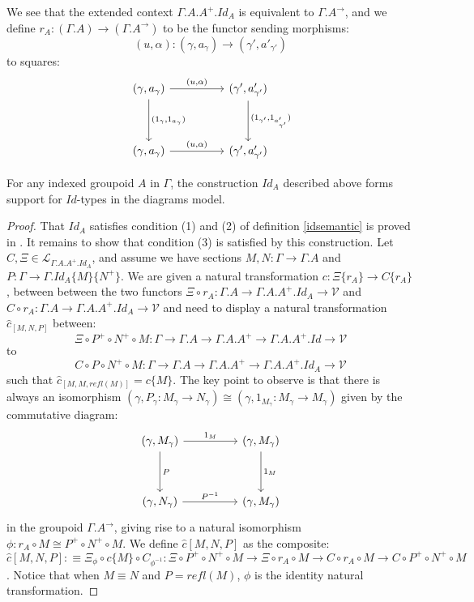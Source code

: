 We see that the extended context $\Gamma.A.A^+.Id_A$ is equivalent to $\Gamma.A^\to$, and we define $r_A : (\Gamma.A) \to (\Gamma.A^\to)$ to be the functor sending morphisms:
\[
  (u, \alpha) : (\gamma, a_\gamma) \to (\gamma', a'_{\gamma'})
\]
to squares:
\[
  \ti
  (\gamma, a_\gamma) \ar[r, "{(u, \alpha)}"] \ar[d, "{(1_{\gamma}, 1_{a_\gamma})}"] &   (\gamma', a'_{\gamma'}) \ar[d, "{(1_{\gamma'}, 1_{a'_{\gamma'}})}"]\\
    (\gamma, a_\gamma) \ar[r, "{(u, \alpha)}"] & (\gamma', a'_{\gamma'})
  \kz
\]
\begin{thm}For any indexed groupoid $A$ in $\Gamma$, the construction $Id_A$ described above forms support for $Id$-types in the diagrams model.
  \begin{proof}That $Id_A$ satisfies condition (1) and (2) of definition \ref{idsemantic} is proved in \cite{hofmann1998}. It remains to show that condition (3) is satisfied by this construction. Let $C, \Xi \in \mathcal{L}_{\Gamma.A.A^+.Id_A}$, and assume we have sections $M, N : \Gamma \to \Gamma.A$ and $P : \Gamma \to \Gamma.Id_A\{M\}\{N^+\}$. We are given a natural transformation $c : \Xi\{r_A\} \to C\{r_A\}$, between between the two functors $\Xi \circ r_A: \Gamma.A \to \Gamma.A.A^+.Id_A \to \mathcal{V}$ and $C \circ r_A : \Gamma.A \to \Gamma.A.A^+.Id_A \to \mathcal{V}$ and need to display a natural transformation $\hat c_{[M,N,P]}$ between:
    \[
      \Xi \circ P^+ \circ N^+ \circ M: \Gamma \to \Gamma.A \to\Gamma.A.A^+ \to \Gamma.A.A^+.Id \to \mathcal{V}
    \]
    to
    \[
      C \circ P \circ N^+ \circ M : \Gamma \to \Gamma.A \to \Gamma.A.A^+ \to \Gamma.A.A^+.Id_A \to \mathcal{V}
    \]
    such that $\hat c_{[M, M, refl(M)]} = c\{M\}$.
    The key point to observe is that there is always an isomorphism $(\gamma, P_\gamma : M_\gamma \to N_\gamma) \cong (\gamma, 1_{M_\gamma} : M_\gamma \to M_\gamma)$ given by the commutative diagram:
    \[
      \ti
      (\gamma, M_\gamma) \ar[d, "P"] \ar[r, "1_M"] & (\gamma, M_\gamma) \ar[d, "1_M"]\\
      (\gamma, N_\gamma) \ar[r, "P^{-1}"] & (\gamma, M_\gamma)
      \kz
    \]
    in the groupoid $\Gamma.A^\to$, giving rise to a natural isomorphism $\phi : r_A \circ M \cong P^+ \circ N^+ \circ M$. We define $\hat c[M, N, P]$ as the composite:
\[
\hat c[M,N,P] :\equiv \Xi_\phi \circ c\{M\} \circ C_{\phi^{-1}} : \Xi \circ P^+ \circ N^+ \circ M \to \Xi \circ r_A \circ M \to C \circ r_A \circ M \to C \circ P^+ \circ N^+ \circ M
\]
. Notice that when $M \equiv N$ and $P = refl(M)$, $\phi$ is the identity natural transformation.
  \end{proof}
\end{thm}


